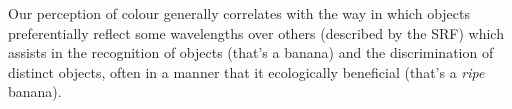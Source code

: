 Our perception of colour generally correlates with the way in which objects preferentially reflect some wavelengths over others (described by the \acrfull{SRF}) which assists in the recognition of objects (that's a banana) and the discrimination of distinct objects, often in a manner that it ecologically beneficial (that's a \emph{ripe} banana).









